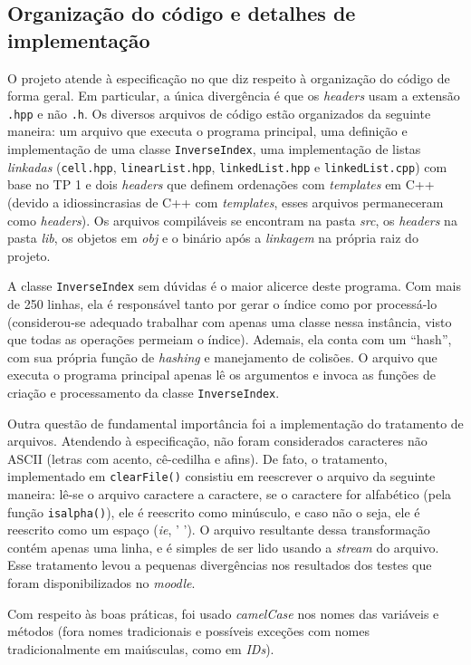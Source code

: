 \documentclass{article}
\def\code#1{\texttt{#1}}
\begin{document}
\subsection{Organização do código e detalhes de implementação}

O projeto atende à especificação no que diz respeito à organização do código de forma geral. Em particular, a única divergência é que os \emph{headers} usam a extensão \code{.hpp} e não \code{.h}. Os diversos arquivos de código estão organizados da seguinte maneira: um arquivo que executa o programa principal, uma definição e implementação de uma classe \code{InverseIndex}, uma implementação de listas \textit{linkadas} (\code{cell.hpp}, \code{linearList.hpp}, \code{linkedList.hpp} e \code{linkedList.cpp}) com base no TP 1 e dois \textit{headers} que definem ordenações com \textit{templates} em C++ (devido a idiossincrasias de C++ com \textit{templates}, esses arquivos permaneceram como \textit{headers}). Os arquivos compiláveis se encontram na pasta \textit{src}, os \textit{headers} na pasta \textit{lib}, os objetos em \textit{obj} e o binário após a \textit{linkagem} na própria raiz do projeto.

A classe \code{InverseIndex} sem dúvidas é o maior alicerce deste programa. Com mais de 250 linhas, ela é responsável tanto por gerar o índice como por processá-lo (considerou-se adequado trabalhar com apenas uma classe nessa instância, visto que todas as operações permeiam o índice). Ademais, ela conta com um ``hash'', com sua própria função de \textit{hashing} e manejamento de colisões. O arquivo que executa o programa principal apenas lê os argumentos e invoca as funções de criação e processamento da classe \code{InverseIndex}.

Outra questão de fundamental importância foi a implementação do tratamento de arquivos. Atendendo à especificação, não foram considerados caracteres não ASCII (letras com acento, cê-cedilha e afins). De fato, o tratamento, implementado em \code{clearFile()} consistiu em reescrever o arquivo da seguinte maneira: lê-se o arquivo caractere a caractere, se o caractere for alfabético (pela função \code{isalpha()}), ele é reescrito como minúsculo, e caso não o seja, ele é reescrito como um espaço (\textit{ie}, ' '). O arquivo resultante dessa transformação contém apenas uma linha, e é simples de ser lido usando a \textit{stream} do arquivo. Esse tratamento levou a pequenas divergências nos resultados dos testes que foram disponibilizados no \textit{moodle}.

Com respeito às boas práticas, foi usado \textit{camelCase} nos nomes das variáveis e métodos (fora nomes tradicionais e possíveis exceções com nomes tradicionalmente em maiúsculas, como em \textit{IDs}).
\end{document}
